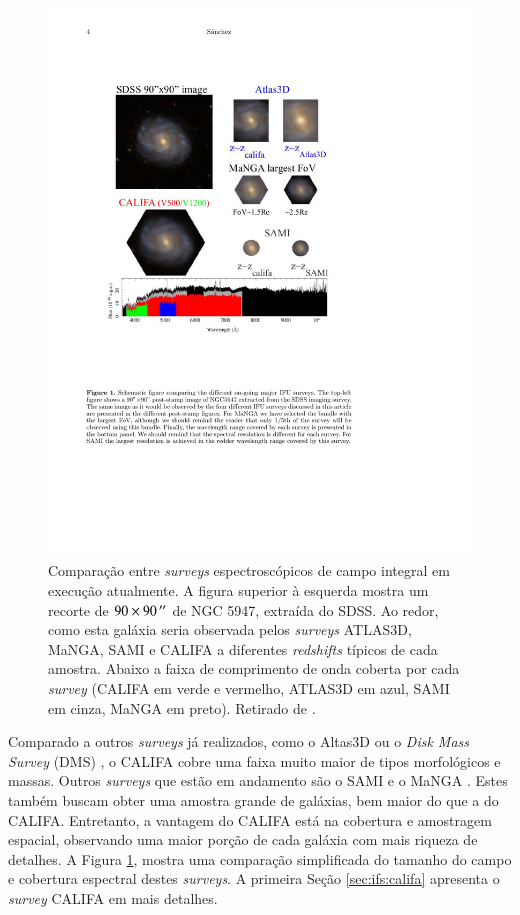 \begin{figure}
	\includegraphics{figuras/surveysIFS}
	\caption[Comparação entre {\em surveys} espectroscópicos de campo integral]
	{Comparação entre {\em surveys} espectroscópicos de campo integral em execução
	atualmente. A figura superior à esquerda mostra um recorte de $90 \times
	90\,^{\prime\prime}$ de NGC 5947, extraída do SDSS. Ao redor, como esta galáxia seria
	observada pelos {\em surveys} ATLAS3D, MaNGA, SAMI e CALIFA a diferentes {\em
	redshifts} típicos de cada amostra. Abaixo a faixa de comprimento de onda
	coberta por cada {\em survey} (CALIFA em verde e vermelho, ATLAS3D em azul,
	SAMI em cinza, MaNGA em preto). Retirado de \citet{Sanchez2014}.}
	\label{fig:surveysIFS}
\end{figure}

Comparado a outros {\em surveys} já realizados, como o Altas3D
\citep{Cappellari2011} ou o {\em Disk Mass Survey} (DMS) \citep{Bershady2010}, o
CALIFA cobre uma faixa muito maior de tipos morfológicos e massas. Outros {\em
surveys} que estão em andamento são o SAMI \citep{Croom2012, Bryant2015} e o
MaNGA \citep{Bundy2015}. Estes também buscam obter uma amostra grande de
galáxias, bem maior do que a do CALIFA. Entretanto, a vantagem do CALIFA está na
cobertura e amostragem espacial, observando uma maior porção de cada galáxia com
mais riqueza de detalhes. A Figura \ref{fig:surveysIFS}, mostra uma comparação
simplificada do tamanho do campo e cobertura espectral destes {\em surveys}. A
primeira Seção \ref{sec:ifs:califa} apresenta o {\em survey} CALIFA em mais
detalhes.
 

